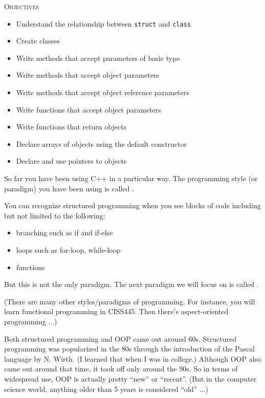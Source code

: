     \newpage{}

\textsc{Objectives}
\begin{itemize}
\item Understand the relationship between \texttt{struct} and \texttt{class}
\item Create classes
\item Write methods that accept parameters of basic type
\item Write methods that accept object parameters
\item Write methods that accept object reference parameters
\item Write functions that accept object parameters
\item Write functions that return objects
\item Declare arrays of objects using the default constructor
\item Declare and use pointers to objects
\end{itemize}


\newpage{}

So far you have been using C++ in a particular way. The programming
style (or paradigm) you have been using is called .

You can recognize structured programming when you see blocks of code
including but not limited to the following:

\begin{itemize}
\item branching such as if and if-else
\item loops such as for-loop, while-loop
\item functions
\end{itemize}

But this is not the only paradigm. The next paradigm we will focus on is
called .

(There are many other styles/paradigms of programming. For instance, you
will learn functional programming in CISS445. Then
there's aspect-oriented programming ...)

Both structured programming and OOP came out around 60s. Structured
programming was popularized in the 80s through the introduction of the
Pascal language by N. Wirth. (I learned that when I was in college.)
Although OOP also came out around that time, it took off only around the
90s. So in terms of widespread use, OOP is actually pretty ``new'' or
``recent''. (But in the computer science world, anything older than 5
years is considered ``old'' ...)

